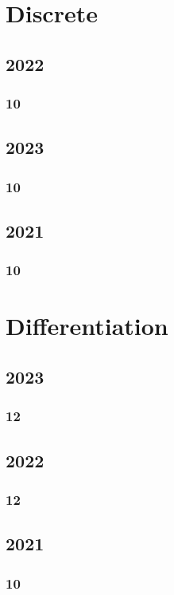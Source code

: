 \documentclass[11pt]{book}
\begin{document}
\chapter{Discrete}
\section{2022}
\subsection{10}

\section{2023}
\subsection{10}

\section{2021}
\subsection{10}



\chapter{Differentiation}
\section{2023}
\subsection{12}


\section{2022}
\subsection{12}

\section{2021}
\subsection{10}

\end{document}
